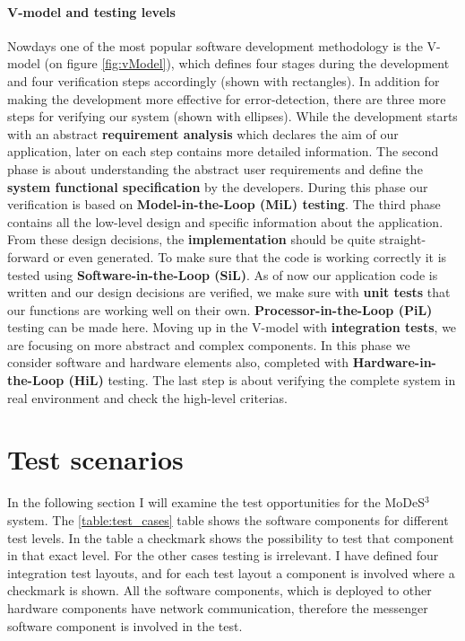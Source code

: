 \paragraph{V-model and testing levels}
Nowdays one of the most popular software development methodology is the V-model (on figure \ref{fig:vModel}), which defines four stages during the development and four verification steps accordingly (shown with rectangles). In addition for making the development more effective for error-detection, there are three more steps for verifying our system (shown with ellipses). While the development starts with an abstract \textbf{requirement analysis} which declares the aim of our application, later on each step contains more detailed information. The second phase is about understanding the abstract user requirements and define the \textbf{system functional specification} by the developers. During this phase our verification is based on \textbf{Model-in-the-Loop (MiL) testing}. The third phase contains all the low-level design and specific information about the application. From these design decisions, the \textbf{implementation} should be quite straight-forward or even generated. To make sure that the code is working correctly it is tested using \textbf{Software-in-the-Loop (SiL)}. 
As of now our application code is written and our design decisions are verified, we make sure with \textbf{unit tests} that our functions are working well on their own. \textbf{Processor-in-the-Loop (PiL)} testing can be made here. Moving up in the V-model with \textbf{integration tests}, we are focusing on more abstract and complex components. In this phase we consider software and hardware elements also, completed with \textbf{Hardware-in-the-Loop (HiL)} testing. The last step is about verifying the complete system in real environment and check the high-level criterias.

\section{Test scenarios}
In the following section I will examine the test opportunities for the MoDeS$^3$ system.  The \ref{table:test_cases} table shows the software components for different test levels. In the table a checkmark shows the possibility to test that component in that exact level. For the other cases testing is irrelevant. I have defined four integration test layouts, and for each test layout a component is involved where a checkmark is shown. All the software components, which is deployed to other hardware components have network communication, therefore the messenger software component is involved in the test.

